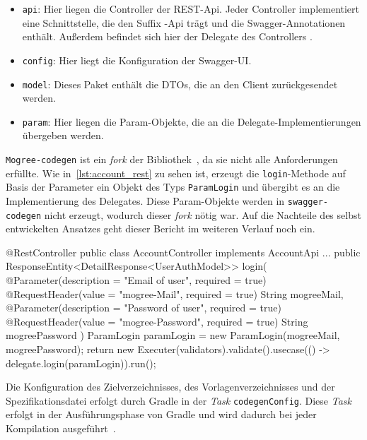 \begin{itemize}
    \item \texttt{api}: Hier liegen die Controller der REST-Api. Jeder Controller implementiert eine Schnittstelle, die den Suffix -Api trägt und die Swagger-Annotationen enthält. Außerdem befindet sich hier der Delegate des Controllers .
    \item \texttt{config}: Hier liegt die Konfiguration der Swagger-UI.
    \item \texttt{model}: Dieses Paket enthält die DTOs, die an den Client zurückgesendet werden.
    \item \texttt{param}: Hier liegen die Param-Objekte, die an die Delegate-Implementierungen übergeben werden.
\end{itemize}

\texttt{Mogree-codegen} ist ein \textit{fork} der Bibliothek~\textcite{githubswaggercodegen}, da sie nicht alle Anforderungen erfüllte. Wie in~\autoref{lst:account_rest} zu sehen ist, erzeugt die \texttt{login}-Methode auf Basis der Parameter ein Objekt des Typs \texttt{ParamLogin} und übergibt es an die Implementierung des Delegates. Diese Param-Objekte werden in \texttt{swagger-codegen} nicht erzeugt, wodurch dieser \textit{fork} nötig war. Auf die Nachteile des selbst entwickelten Ansatzes geht dieser Bericht im weiteren Verlauf noch ein.

\begin{JavaCode}[numbers=none, caption={Der generierte \texttt{AccountController}}, label=lst:account_rest]
@RestController
public class AccountController implements AccountApi {
    ...
    public ResponseEntity<DetailResponse<UserAuthModel>> login(
            @Parameter(description = "Email of user", required = true)
            @RequestHeader(value = "mogree-Mail", required = true)
            String mogreeMail,
            @Parameter(description = "Password of user", required = true)
            @RequestHeader(value = "mogree-Password", required = true)
            String mogreePassword
    ) {
        ParamLogin paramLogin = new ParamLogin(mogreeMail, mogreePassword);
        return new Executer(validators).validate().usecase(() -> delegate.login(paramLogin)).run();
    }
}
\end{JavaCode}

Die Konfiguration des Zielverzeichnisses, des Vorlagenverzeichnisses und der Spezifikationsdatei erfolgt durch Gradle in der \textit{Task} \texttt{codegenConfig}. Diese \textit{Task} erfolgt in der Ausführungsphase von Gradle und wird dadurch bei jeder Kompilation ausgeführt~\parencite{gradlelifecycle}.

